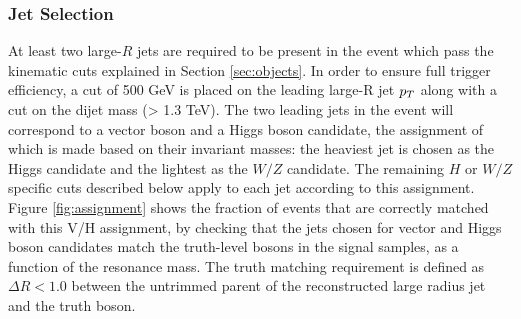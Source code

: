 \subsubsection{Jet Selection}
At least two large-$R$ jets are required to be present in the event which pass the kinematic cuts explained in Section \ref{sec:objects}.
In order to ensure full trigger efficiency, a cut of 500 GeV is placed on the leading large-R jet $p_{T}$ along with a cut on the dijet mass (\mjj > 1.3 TeV).
The two leading jets in the event will correspond to a vector boson and a Higgs boson candidate, the assignment of which is made based on their invariant masses: the heaviest jet is chosen as the Higgs candidate and the lightest as the $W/Z$ candidate.
The remaining $H$ or $W/Z$ specific cuts described below apply to each jet according to this assignment.
Figure \ref{fig:assignment} shows the fraction of events that are correctly matched with this V/H assignment, by checking that the jets chosen for vector and Higgs boson candidates match the truth-level bosons in the signal samples, as a function of the resonance mass.
The truth matching requirement is defined as $\Delta R < 1.0$ between the untrimmed parent of the reconstructed large radius jet and the truth boson.


